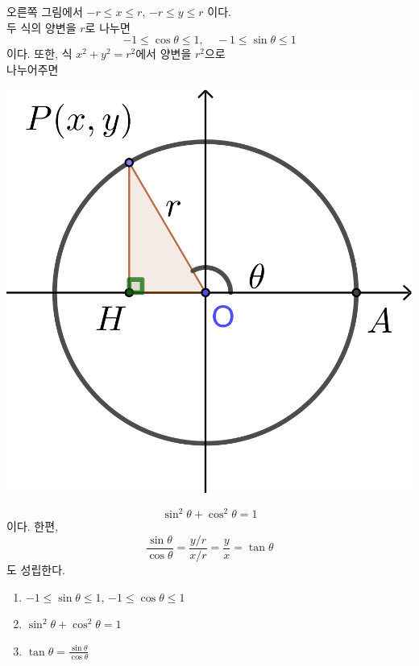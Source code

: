 \documentclass{oblivoir}
\begin{document}
\noindent\begin{minipage}{.7\textwidth}
오른쪽 그림에서 %
\(-r\le x\le r\), \(-r\le y\le r\)
이다.\\
두 식의 양변을 \(r\)로 나누면
\[-1\le\cos\theta\le1,\quad-1\le\sin\theta\le1\]
이다.
또한, 식 \(x^2+y^2=r^2\)에서 양변을 \(r^2\)으로\\
나누어주면\footnotemark
\end{minipage}
\begin{minipage}{.3\textwidth}
\centering
\vspace{10pt}
\includegraphics[width=.8\textwidth]{property_1}
\vspace{10pt}
\end{minipage}
\[\sin^2\theta+\cos^2\theta=1\]
이다.
한편,
\[\frac{\sin\theta}{\cos\theta}=\frac{y/r}{x/r}=\frac yx=\tan\theta\]
도 성립한다.

\bigskip
\begin{mdframed}
%
\begin{enumerate}\label{property1}
\item
\(-1\le\sin\theta\le1\), \(-1\le\cos\theta\le1\)
\item
\(\sin^2\theta+\cos^2\theta=1\)
\item
\(\tan\theta=\frac{\sin\theta}{\cos\theta}\)
\end{enumerate}
\end{mdframed}
\end{document}
